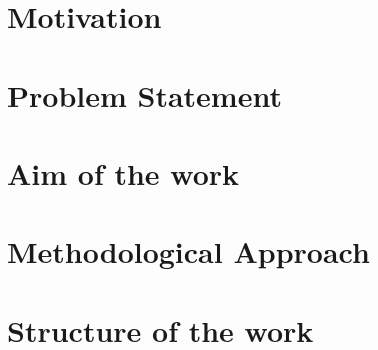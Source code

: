\section{Motivation}


\section{Problem Statement}


\section{Aim of the work}


\section{Methodological Approach}


\section{Structure of the work}


